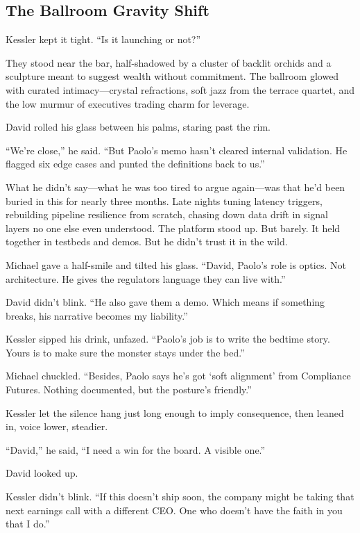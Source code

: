 \subsection{The Ballroom Gravity Shift}

Kessler kept it tight. ``Is it launching or not?''

They stood near the bar, half-shadowed by a cluster of backlit orchids and a sculpture meant to 
suggest wealth without commitment. The ballroom glowed with curated intimacy—crystal refractions, 
soft jazz from the terrace quartet, and the low murmur of executives trading charm for leverage.

David rolled his glass between his palms, staring past the rim.

``We’re close,'' he said. ``But Paolo’s memo hasn’t cleared internal validation. He flagged six 
edge cases and punted the definitions back to us.''

What he didn’t say—what he was too tired to argue again—was that he’d been buried in this for 
nearly three months. Late nights tuning latency triggers, rebuilding pipeline resilience from 
scratch, chasing down data drift in signal layers no one else even understood. The platform 
stood up. But barely. It held together in testbeds and demos. But he didn’t trust it in the wild.

Michael gave a half-smile and tilted his glass. ``David, Paolo’s role is optics. Not architecture. 
He gives the regulators language they can live with.''

David didn’t blink. ``He also gave them a demo. Which means if something breaks, his narrative 
becomes my liability.''

Kessler sipped his drink, unfazed. ``Paolo’s job is to write the bedtime story. Yours is to 
make sure the monster stays under the bed.''


Michael chuckled. ``Besides, Paolo says he’s got ‘soft alignment’ from Compliance Futures. 
Nothing documented, but the posture’s friendly.''

Kessler let the silence hang just long enough to imply consequence, then leaned in, voice lower, steadier.

``David,'' he said, ``I need a win for the board. A visible one.''

David looked up.

Kessler didn’t blink. ``If this doesn’t ship soon, the company might be taking that next earnings call with a 
different CEO. One who doesn’t have the faith in you that I do.''

